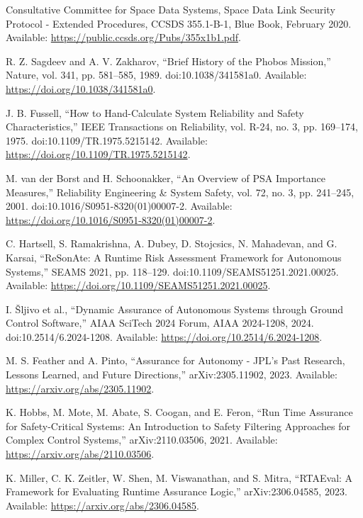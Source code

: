  Consultative Committee for Space Data Systems, Space Data Link Security Protocol - Extended Procedures, CCSDS 355.1-B-1, Blue Book, February 2020. Available: \url{https://public.ccsds.org/Pubs/355x1b1.pdf}.

 R. Z. Sagdeev and A. V. Zakharov, ``Brief History of the Phobos Mission,'' Nature, vol. 341, pp. 581--585, 1989. doi:10.1038/341581a0. Available: \url{https://doi.org/10.1038/341581a0}.

 J. B. Fussell, ``How to Hand-Calculate System Reliability and Safety Characteristics,'' IEEE Transactions on Reliability, vol. R-24, no. 3, pp. 169--174, 1975. doi:10.1109/TR.1975.5215142. Available: \url{https://doi.org/10.1109/TR.1975.5215142}.

 M. van der Borst and H. Schoonakker, ``An Overview of PSA Importance Measures,'' Reliability Engineering \& System Safety, vol. 72, no. 3, pp. 241--245, 2001. doi:10.1016/S0951-8320(01)00007-2. Available: \url{https://doi.org/10.1016/S0951-8320(01)00007-2}.

 C. Hartsell, S. Ramakrishna, A. Dubey, D. Stojcsics, N. Mahadevan, and G. Karsai, ``ReSonAte: A Runtime Risk Assessment Framework for Autonomous Systems,'' SEAMS 2021, pp. 118--129. doi:10.1109/SEAMS51251.2021.00025. Available: \url{https://doi.org/10.1109/SEAMS51251.2021.00025}.

 I. \v{S}ljivo et al., ``Dynamic Assurance of Autonomous Systems through Ground Control Software,'' AIAA SciTech 2024 Forum, AIAA 2024-1208, 2024. doi:10.2514/6.2024-1208. Available: \url{https://doi.org/10.2514/6.2024-1208}.

 M. S. Feather and A. Pinto, ``Assurance for Autonomy - JPL's Past Research, Lessons Learned, and Future Directions,'' arXiv:2305.11902, 2023. Available: \url{https://arxiv.org/abs/2305.11902}.

 K. Hobbs, M. Mote, M. Abate, S. Coogan, and E. Feron, ``Run Time Assurance for Safety-Critical Systems: An Introduction to Safety Filtering Approaches for Complex Control Systems,'' arXiv:2110.03506, 2021. Available: \url{https://arxiv.org/abs/2110.03506}.

 K. Miller, C. K. Zeitler, W. Shen, M. Viswanathan, and S. Mitra, ``RTAEval: A Framework for Evaluating Runtime Assurance Logic,'' arXiv:2306.04585, 2023. Available: \url{https://arxiv.org/abs/2306.04585}.


